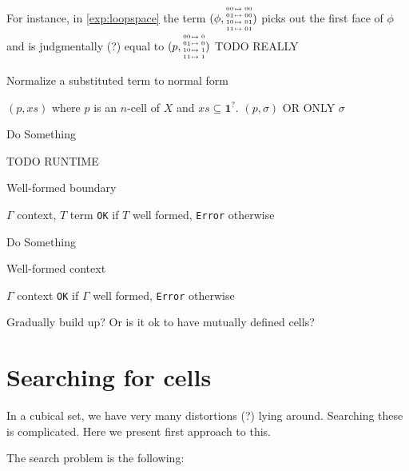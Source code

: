 \documentclass[11pt]{article}
\theoremstyle{definition}
\newcommand{\pint}[1]{\mathbf{1}^{#1}}
\newcommand{\substfour}[4]{\tiny
  \arraycolsep=.4pt\def\arraystretch{1}
  \begin{array}{ll}
    00 &\mapsto {#1} \\
    01 &\mapsto {#2} \\
    10 &\mapsto {#3} \\
    11 &\mapsto {#4} 
  \end{array}
}
\begin{document}
For instance, in \autoref{exp:loopspace} the term
$(\phi,\substfour{00}{00}{01}{01})$ picks out the first face of $\phi$ and
is judgmentally (?) equal to $(p,\substfour{0}{0}{1}{1})$ TODO REALLY

\begin{algorithm}[H]
  \caption{Normalize a substituted term to normal form}\label{alg:normalize}
  \begin{algorithmic}
    \Require $(p, xs)$ where $p$ is an $n$-cell of $X$ and $xs \subseteq \pint{?}$.
    \Ensure $(p,\sigma)$ OR ONLY $\sigma$

    \State Do Something
    \EndProcedure
  \end{algorithmic}
\end{algorithm}

TODO RUNTIME

\begin{algorithm}[H]
  \caption{Well-formed boundary}\label{alg:wellformedboundary}
  \begin{algorithmic}
    \Require $\Gamma$ context, $T$ term
    \Ensure \texttt{OK} if $T$ well formed, \texttt{Error} otherwise

    \State Do Something
    \EndProcedure
  \end{algorithmic}
\end{algorithm}


\begin{algorithm}[H]
  \caption{Well-formed context}\label{alg:wellformedcontext}
  \begin{algorithmic}
    \Require $\Gamma$ context
    \Ensure \texttt{OK} if $\Gamma$ well formed, \texttt{Error} otherwise

    \State Gradually build up? Or is it ok to have mutually defined cells?
    \EndProcedure
  \end{algorithmic}
\end{algorithm}



\section{Searching for cells}

In a cubical set, we have very many distortions (?) lying around. Searching
these is complicated. Here we present first approach to this.

The search problem is the following:
\end{document}
